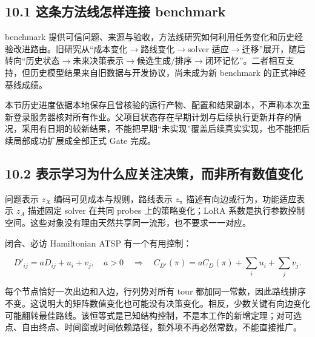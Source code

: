 \documentclass[UTF8,10pt,a4paper,fontset=fandol]{ctexart}
\begin{document}

\subsection*{10.1 这条方法线怎样连接 benchmark}


benchmark 提供可信问题、来源与验收，方法线研究如何利用任务变化和历史经验改进路由。旧研究从“成本变化\ensuremath{\rightarrow}路线变化\ensuremath{\rightarrow}solver 适应\ensuremath{\rightarrow}迁移”展开，随后转向“历史状态\ensuremath{\rightarrow}未来决策表示\ensuremath{\rightarrow}候选生成/\allowbreak{}排序\ensuremath{\rightarrow}闭环记忆”。二者相互支持，但历史模型结果来自旧数据与开发协议，尚未成为新 benchmark 的正式神经基线成绩。


本节历史进度依据本地保存且曾核验的运行产物、配置和结果副本，不声称本次重新登录服务器核对所有作业。父项目状态存在早期计划与后续执行更新并存的情况，采用有日期的较新结果，不能把早期“未实现”覆盖后续真实实现，也不能把后续局部成功扩展成全部正式 Gate 完成。


\subsection*{10.2 表示学习为什么应关注决策，而非所有数值变化}


问题表示 \ensuremath{z_{X}} 编码可见成本与规则，路线表示 \ensuremath{z_{\mathrm{\pi}}} 描述有向边或行为，功能适应表示 \ensuremath{z_{A}} 描述固定 solver 在共同 probes 上的策略变化；LoRA 系数是执行参数控制空间。这些对象没有理由天然共享同一流形，也不要求一一对应。


闭合、必访 Hamiltonian ATSP 有一个有用控制：


\begin{equation}
D'_{ij}=aD_{ij}+u_i+v_j,\quad a>0
\quad\Longrightarrow\quad
C_{D'}(\pi)=aC_D(\pi)+\sum_i u_i+\sum_jv_j.
\end{equation}

每个节点恰好一次出边和入边，行列势对所有 tour 都加同一常数，因此路线排序不变。这说明大的矩阵数值变化也可能没有决策变化。相反，少数关键有向边变化可能翻转最佳路线。该恒等式是已知结构控制，不是本工作的新增定理；对可选点、自由终点、时间窗或时间依赖路径，额外项不再必然常数，不能直接推广。
\end{document}
